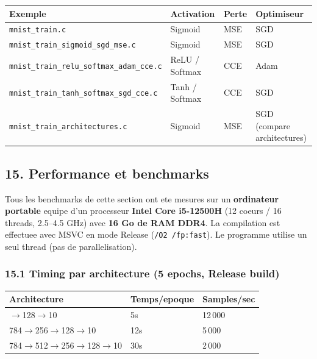 \documentclass[
  letterpaper,
  DIV=11,
  numbers=noendperiod]{scrartcl}
\newcounter{none} %
\begin{document}
{\def\LTcaptype{none}
\begin{longtable}[]{@{}llll@{}}
\toprule\noalign{}
Exemple & Activation & Perte & Optimiseur \\
\midrule\noalign{}
\endhead
\bottomrule\noalign{}
\endlastfoot
\texttt{mnist\_train.c} & Sigmoid & MSE & SGD \\
\texttt{mnist\_train\_sigmoid\_sgd\_mse.c} & Sigmoid & MSE & SGD \\
\texttt{mnist\_train\_relu\_softmax\_adam\_cce.c} & ReLU / Softmax & CCE & Adam \\
\texttt{mnist\_train\_tanh\_softmax\_sgd\_cce.c} & Tanh / Softmax & CCE & SGD \\
\texttt{mnist\_train\_architectures.c} & Sigmoid & MSE & SGD (compare architectures) \\
\end{longtable}
}

\subsection{15. Performance et benchmarks}\label{performance-benchmarks}

Tous les benchmarks de cette section ont ete mesures sur un \textbf{ordinateur portable} equipe d'un processeur \textbf{Intel Core i5-12500H} (12 coeurs / 16 threads, 2.5--4.5 GHz) avec \textbf{16 Go de RAM DDR4}. La compilation est effectuee avec MSVC en mode Release (\texttt{/O2 /fp:fast}). Le programme utilise un seul thread (pas de parallelisation).

\subsubsection{15.1 Timing par architecture (5 epochs, Release build)}\label{timing-architecture}

{\def\LTcaptype{none}
\begin{longtable}[]{@{}lll@{}}
\toprule\noalign{}
Architecture & Temps/epoque & Samples/sec \\
\midrule\noalign{}
\endhead
\bottomrule\noalign{}
\endlastfoot
784$\to$128$\to$10 & 5s & 12\,000 \\
784$\to$256$\to$128$\to$10 & 12s & 5\,000 \\
784$\to$512$\to$256$\to$128$\to$10 & 30s & 2\,000 \\
\end{longtable}
}
\end{document}
